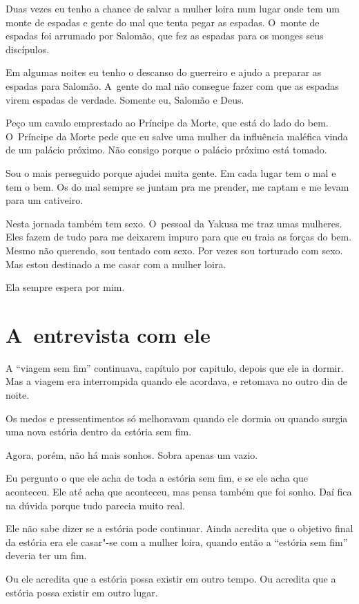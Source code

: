 Duas vezes eu tenho a chance de salvar a mulher loira num lugar onde tem
um monte de espadas e gente do mal que tenta pegar as espadas. O~monte
de espadas foi arrumado por Salomão, que fez as espadas para os monges
seus discípulos.

Em algumas noites eu tenho o descanso do guerreiro e ajudo a preparar as
espadas para Salomão. A~gente do mal não consegue fazer com que as
espadas virem espadas de verdade. Somente eu, Salomão e Deus.

Peço um cavalo emprestado ao Príncipe da Morte, que está do lado do bem.
O~Príncipe da Morte pede que eu salve uma mulher da influência maléfica
vinda de um palácio próximo. Não consigo porque o palácio próximo está
tomado.

Sou o mais perseguido porque ajudei muita gente. Em cada lugar tem o mal
e tem o bem. Os do mal sempre se juntam pra me prender, me raptam e me
levam para um cativeiro.

Nesta jornada também tem sexo. O~pessoal da Yakusa me traz umas
mulheres. Eles fazem de tudo para me deixarem impuro para que eu traia
as forças do bem. Mesmo não querendo, sou tentado com sexo. Por vezes
sou torturado com sexo. Mas estou destinado a me casar com a mulher
loira.

Ela sempre espera por mim.

\section{A~entrevista com ele}

A ``viagem sem fim'' continuava, capítulo por capitulo, depois que ele
ia dormir. Mas a viagem era interrompida quando ele acordava, e retomava
no outro dia de noite.

Os medos e pressentimentos só melhoravam quando ele dormia ou quando
surgia uma nova estória dentro da estória sem fim.

Agora, porém, não há mais sonhos. Sobra apenas um vazio.

Eu pergunto o que ele acha de toda a estória sem fim, e se ele acha que
aconteceu. Ele até acha que aconteceu, mas pensa também que foi sonho.
Daí fica na dúvida porque tudo parecia muito real.

Ele não sabe dizer se a estória pode continuar. Ainda acredita que o
objetivo final da estória era ele casar"-se com a mulher loira, quando
então a ``estória sem fim'' deveria ter um fim.

Ou ele acredita que a estória possa existir em outro tempo. Ou acredita
que a estória possa existir em outro lugar.

